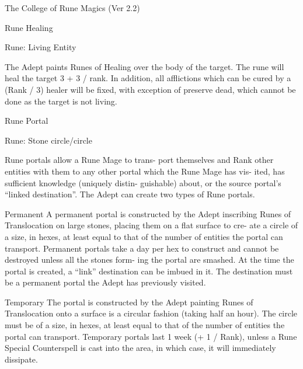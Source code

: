\begin{Chapter}{The College of Rune Magics (Ver 2.2)}
\begin{ritual}[R-5]{Rune Healing }

Rune: Living Entity 
\begin{effects}
 The  Adept  paints  Runes  of  Healing  over 
the body of the target. The rune will heal the target 
3  +  3  /  rank.  In  addition,  all  afflictions  which  can 
be cured by a (Rank / 3) healer will be fixed, with 
exception  of  preserve  dead,  which  cannot be  done 
as the target is not living. 

\end{effects}
\end{ritual}

\begin{ritual}[R-6]{Rune Portal }

Rune: Stone circle/circle 
\begin{effects}
Rune portals allow a Rune Mage to trans-
port themselves and Rank other entities with them 
to  any  other  portal  which  the  Rune  Mage  has  vis-
ited,  has  sufficient  knowledge  (uniquely  distin-
guishable)  about,  or  the  source  portal’s  “linked 
destination”.  The  Adept  can  create  two  types  of 
Rune portals. 

Permanent  A  permanent  portal  is  constructed  by 
the  Adept  inscribing  Runes  of  Translocation  on 
large stones, placing them on a flat surface to cre-
ate a circle of a size, in hexes, at least equal to that 
of  the  number  of  entities  the  portal  can  transport. 
Permanent  portals  take  a  day  per  hex  to  construct 
and cannot be destroyed unless all the stones form-
ing the portal are smashed. At the time the portal is 
created,  a  “link”  destination  can  be  imbued  in  it. 
The  destination  must  be  a  permanent  portal  the 
Adept has previously visited. 

Temporary  The  portal  is  constructed by  the  Adept 
painting Runes of Translocation onto a surface is a 
circular  fashion  (taking  half  an  hour).  The  circle 
must be of a size, in hexes, at least equal to that of 
the  number  of  entities  the  portal  can  transport. 
Temporary portals last 1 week (+ 1 / Rank), unless 
a Rune Special Counterspell is cast into the area, in 
which case, it will immediately dissipate. 


\end{effects}
\end{ritual}
\end{Chapter}
